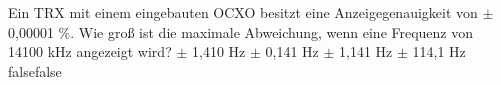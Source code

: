     {Ein TRX mit einem eingebauten OCXO besitzt eine Anzeigegenauigkeit von $±$0,00001 \%. Wie groß ist die maximale Abweichung, wenn eine Frequenz von 14100 kHz angezeigt wird?}
    {$±$ 1,410 Hz}
    {$±$ 0,141 Hz}
    {$±$ 1,141 Hz}
    {$±$ 114,1 Hz}
    {false}{false}